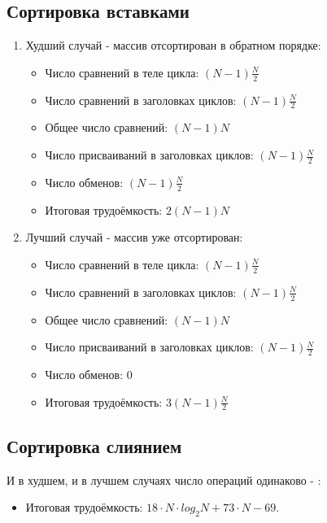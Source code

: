 \documentclass[12pt, a4paper]{report}
\begin{document}
	\subsection{Сортировка вставками}
	\begin{enumerate}
		\item Худший случай - массив отсортирован в обратном порядке:
		\begin{itemize}
			\item Число сравнений в теле цикла: $(N-1)\frac{N}{2}$
			\item Число сравнений в заголовках циклов: $(N-1)\frac{N}{2}$
			\item Общее число сравнений: $(N-1)N$
			\item Число присваиваний в заголовках циклов: $(N-1)\frac{N}{2}$
			\item Число обменов: $(N-1)\frac{N}{2}$\\
			\item Итоговая трудоёмкость: $2(N-1)N$
		\end{itemize}
		\item Лучший случай - массив уже отсортирован:
		\begin{itemize}
			\item Число сравнений в теле цикла: $(N-1)\frac{N}{2}$
			\item Число сравнений в заголовках циклов: $(N-1)\frac{N}{2}$
			\item Общее число сравнений: $(N-1)N$
			\item Число присваиваний в заголовках циклов: $(N-1)\frac{N}{2}$
			\item Число обменов: $0$\\
			\item Итоговая трудоёмкость: $3(N-1)\frac{N}{2}$
		\end{itemize}
	\end{enumerate}
	
	\subsection{Сортировка слиянием}
	И в худшем, и в лучшем случаях число операций одинаково - :
	\begin{itemize}
		\item Итоговая трудоёмкость: $18\cdot N \cdot log_{2}N  + 73\cdot N - 69$.
	\end{itemize}
	
\end{document}
